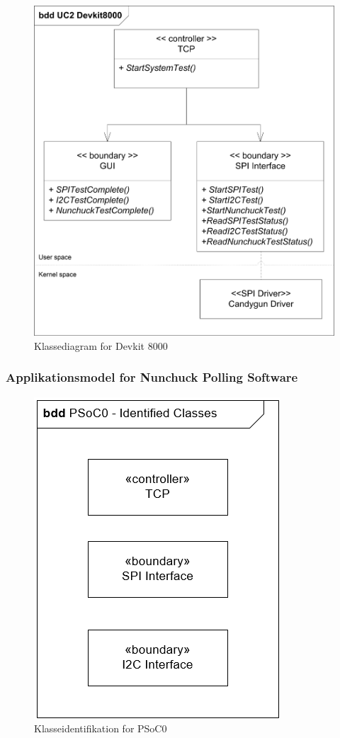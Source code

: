 \begin{figure}[H]
	\centering
	\includegraphics[] {Systemarkitektur/images/Devkitklassediagram.png}
	\caption{Klassediagram for Devkit 8000}
	\label{fig:klasseDevkit}
\end{figure}

\subsubsection{Applikationsmodel for Nunchuck Polling Software}

\begin{figure}[H]
	\centering
	\includegraphics[scale=0.8]{Systemarkitektur/images/KlasseIdentifikationPSoC0.png}
	\caption{Klasseidentifikation for PSoC0}
	\label{fig:klasseidentifikationPSoC}
\end{figure}

